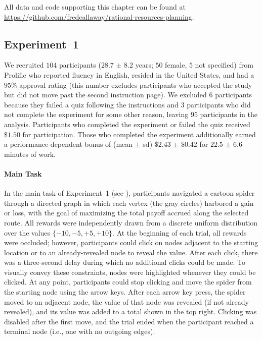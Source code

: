All data and code supporting this chapter can be found at \url{https://github.com/fredcallaway/rational-resources-planning}.


\subsection{Experiment~1} \label{sec:planning-methods1}
We recruited $104$ participants ($28.7$ $\pm$ $8.2$ years; $50$ female, $5$ not specified) from Prolific who reported fluency in English, resided in the United States, and had a $95\%$ approval rating (this number excludes participants who accepted the study but did not move past the second instruction page). We excluded $6$ participants because they failed a quiz following the instructions and $3$ participants who did not complete the experiment for some other reason, leaving $95$ participants in the analysis. Participants who completed the experiment or failed the quiz received $\$1.50$ for participation. Those who completed the experiment additionally earned a performance-dependent bonus of (mean $\pm$ sd) $\$2.43$ $\pm$ $\$0.42$ for $22.5$ $\pm$ $6.6$ minutes of work.

\paragraph{Main Task}
In the main task of Experiment~1 (see ), participants navigated a cartoon spider through a directed graph in which each vertex (the gray circles) harbored a gain or loss, with the goal of maximizing the total payoff accrued along the selected route. All rewards were independently drawn from a discrete uniform distribution over the values $\{-10,-5, +5, +10\}$. At the beginning of each trial, all rewards were occluded; however, participants could click on nodes adjacent to the starting location or to an already-revealed node to reveal the value. After each click, there was a three-second delay during which no additional clicks could be made. To visually convey these constraints, nodes were highlighted whenever they could be clicked. At any point, participants could stop clicking and move the spider from the starting node using the arrow keys. After each arrow key press, the spider moved to an adjacent node, the value of that node was revealed (if not already revealed), and its value was added to a total shown in the top right. Clicking was disabled after the first move, and the trial ended when the participant reached a terminal node (i.e., one with no outgoing edges).


